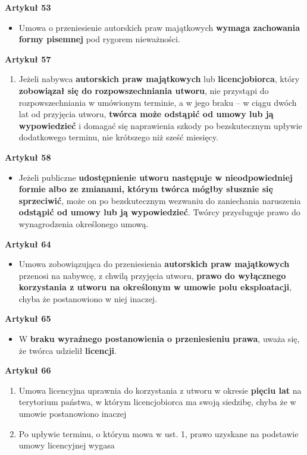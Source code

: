 \documentclass[12pt,a4paper]{article}
\begin{document}
\textbf{Artykuł 53}
\begin{itemize}
\item Umowa o przeniesienie autorskich praw majątkowych \textbf{wymaga zachowania formy pisemnej} pod rygorem nieważności.
\end{itemize}
\textbf{Artykuł 57}
\begin{enumerate}
\item Jeżeli nabywca \textbf{autorskich praw majątkowych} lub \textbf{licencjobiorca}, który \textbf{zobowiązał się do rozpowszechniania utworu}, nie przystąpi do rozpowszechniania w umówionym terminie, a w jego braku – w ciągu dwóch lat od przyjęcia utworu, \textbf{twórca może odstąpić od umowy lub ją wypowiedzieć} i domagać się naprawienia szkody po bezskutecznym upływie dodatkowego terminu, nie krótszego niż sześć miesięcy.
\end{enumerate}
\textbf{Artykuł 58}
\begin{itemize}
\item Jeżeli publiczne \textbf{udostępnienie utworu następuje w nieodpowiedniej formie albo ze zmianami, którym twórca mógłby słusznie się sprzeciwić}, może on po bezskutecznym wezwaniu do zaniechania naruszenia\textbf{ odstąpić od umowy lub ją wypowiedzieć}. Twórcy przysługuje prawo do wynagrodzenia określonego umową.
\end{itemize}
\textbf{Artykuł 64}
\begin{itemize}
\item Umowa zobowiązująca do przeniesienia \textbf{autorskich praw majątkowych} przenosi na nabywcę, z chwilą przyjęcia utworu, \textbf{prawo do wyłącznego korzystania z utworu na określonym w umowie polu eksploatacji}, chyba że postanowiono w niej inaczej.
\end{itemize}
\textbf{Artykuł 65}
\begin{itemize}
\item W \textbf{braku wyraźnego postanowienia o przeniesieniu prawa}, uważa się, że twórca udzielił \textbf{licencji}.
\end{itemize}
\textbf{Artykuł 66}
\begin{enumerate}
\item Umowa licencyjna uprawnia do korzystania z utworu w okresie \textbf{pięciu lat} na terytorium państwa, w którym licencjobiorca ma swoją siedzibę, chyba że w umowie postanowiono inaczej
\item Po upływie terminu, o którym mowa w ust. 1, prawo uzyskane na podstawie umowy licencyjnej wygasa
\end{enumerate}
\end{document}
